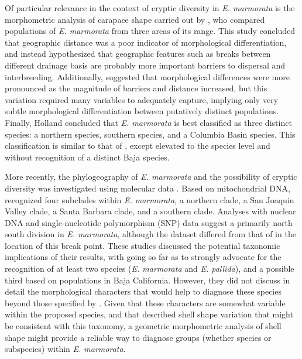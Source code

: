 \documentclass[12pt,letterpaper]{article}
\begin{document}
Of particular relevance in the context of cryptic diversity in \textit{E. marmorata} is the morphometric analysis of carapace shape carried out by \citet{Holland1992}, who compared populations of \textit{E. marmorata} from three areas of its range. This study concluded that geographic distance was a poor indicator of morphological differentiation, and instead hypothesized that geographic features such as breaks between different drainage basis are probably more important barriers to dispersal and interbreeding. Additionally, \citet{Holland1992} suggested that morphological differences were more pronounced as the magnitude of barriers and distance increased, but this variation required many variables to adequately capture, implying only very subtle morphological differentiation between putatively distinct populations. Finally, Holland concluded that \textit{E. marmorata} is best classified as three distinct species: a northern species, southern species, and a Columbia Basin species. This classification is similar to that of \citet{Seeliger1945}, except elevated to the species level and without recognition of a distinct Baja species. 

More recently, the phylogeography of \textit{E. marmorata} and the possibility of cryptic diversity was investigated using molecular data \citep{Spinks2005,Spinks2010,Spinks2014}. Based on mitochondrial DNA, \citet{Spinks2005} recognized four subclades within \textit{E. marmorata}, a northern clade, a San Joaquin Valley clade, a Santa Barbara clade, and a southern clade. Analyses with nuclear DNA \citep{Spinks2010} and single-nucleotide polymorphism (SNP) data suggest a primarily north--south division in \textit{E. marmorata}, although the dataset differed from that of \citet{Spinks2005} in the location of this break point. These studies discussed the potential taxonomic implications of their results, with \citet{Spinks2014} going so far as to strongly advocate for the recognition of at least two species (\emph{E. marmorata} and \emph{E. pallida}), and a possible third based on populations in Baja California. However, they did not discuss in detail the morphological characters that would help to diagnose these species beyond those specified by \citet{Seeliger1945}. Given that these characters are somewhat variable within the proposed species, and that \citet{Holland1992} described shell shape variation that might be consistent with this taxonomy, a geometric morphometric analysis of shell shape might provide a reliable way to diagnose groups (whether species or subspecies) within \textit{E. marmorata}.
\end{document}
